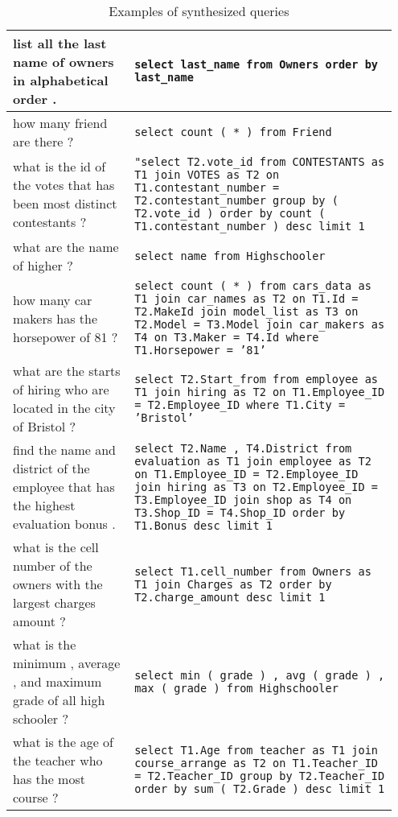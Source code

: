 \documentclass[11pt,a4paper]{article}
\begin{document}
\clearpage{}\begin{table*}[t]
    \centering
    \begin{tabular}{p{0.3\linewidth} p{0.65\linewidth}}
    \toprule
    list all the last name of owners in alphabetical order .
    &
    \texttt{select last\_name from Owners order by last\_name}
    \\ \midrule
    how many friend are there ?
    &
    \texttt{select count ( * ) from Friend}
    \\ \midrule
    what is the id of the votes that has been most distinct contestants ?
    &
    \texttt{"select T2.vote\_id from CONTESTANTS as T1 join VOTES as T2 on T1.contestant\_number = T2.contestant\_number group by ( T2.vote\_id ) order by count ( T1.contestant\_number ) desc limit 1}
    \\ \midrule
    what are the name of higher ?
    &
    \texttt{select name from Highschooler}
    \\ \midrule
    how many car makers has the horsepower of 81 ?
    &
    \texttt{select count ( * ) from cars\_data as T1 join car\_names as T2 on T1.Id = T2.MakeId join model\_list as T3 on T2.Model = T3.Model join car\_makers as T4 on T3.Maker = T4.Id where T1.Horsepower = '81'}
    \\ \midrule
    what are the starts of hiring who are located in the city of Bristol ?
    &
    \texttt{select T2.Start\_from from employee as T1 join hiring as T2 on T1.Employee\_ID = T2.Employee\_ID where T1.City = 'Bristol'}
    \\ \midrule
    find the name and district of the employee that has the highest evaluation bonus .
    &
    \texttt{select T2.Name , T4.District from evaluation as T1 join employee as T2 on T1.Employee\_ID = T2.Employee\_ID join hiring as T3 on T2.Employee\_ID = T3.Employee\_ID join shop as T4 on T3.Shop\_ID = T4.Shop\_ID order by T1.Bonus desc limit 1}
    \\ \midrule
    what is the cell number of the owners with the largest charges amount ?
    &
    \texttt{select T1.cell\_number from Owners as T1 join Charges as T2 order by T2.charge\_amount desc limit 1}
    \\ \midrule
    what is the minimum , average , and maximum grade of all high schooler ?
    &
    \texttt{select min ( grade ) , avg ( grade ) , max ( grade ) from Highschooler}
    \\ \midrule
    what is the age of the teacher who has the most course ?
    &
    \texttt{select T1.Age from teacher as T1 join course\_arrange as T2 on T1.Teacher\_ID = T2.Teacher\_ID group by T2.Teacher\_ID order by sum ( T2.Grade ) desc limit 1}
    \\ \bottomrule
    \end{tabular}
    \caption{Examples of synthesized queries}
    \label{tab:synthesized}
\end{table*}\clearpage{}
\end{document}
